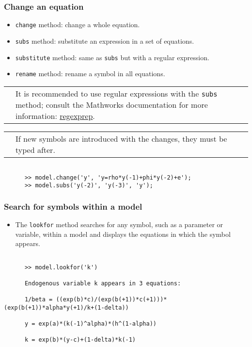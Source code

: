\documentclass[10pt,slidestop]{beamer}
\makeatletter
\theoremstyle{plain}
\newcommand{\dnote}[1]{%
    \noindent %
    \begin{tabular}{@{}m{0.13\textwidth}@{}m{0.87\textwidth}@{}}%
        \huge\textdbend &#1%
    \end{tabular}%
    \par %
}
\makeatother
\begin{document}
\begin{frame}[c,fragile]
  \frametitle{Change an equation}

  \begin{itemize}
  \item \verb+change+ method: change a whole equation.
  \item \verb+subs+ method: substitute an expression in a set of equations.
  \item \verb+substitute+ method: same as \verb+subs+ but with a regular expression.
  \item \verb+rename+ method: rename a symbol in all equations.
  \end{itemize}

    \medskip

    \dnote{It is recommended to use regular expressions with the \texttt{subs} method; consult the Mathworks documentation for more information: \href{https://fr.mathworks.com/help/matlab/ref/regexprep.html}{regexprep}.}

    \bigskip

    \dnote{If new symbols are introduced with the changes, they must be typed after.}

    \bigskip

    \begin{lstlisting}[style=MatlabConsole]

      >> model.change('y', 'y=rho*y(-1)+phi*y(-2)+e');
      >> model.subs('y(-2)', 'y(-3)', 'y');
  \end{lstlisting}

\end{frame}


\begin{frame}[c,fragile]
  \frametitle{Search for symbols within a model}

  \begin{itemize}

  \item The \verb+lookfor+ method searches for any symbol, such as a parameter or variable, within a model and displays the equations in which the symbol appears.\newline

  \end{itemize}

    \medskip

    \begin{lstlisting}[style=MatlabConsole]

      >> model.lookfor('k')

      Endogenous variable k appears in 3 equations:

      1/beta = ((exp(b)*c)/(exp(b(+1))*c(+1)))*(exp(b(+1))*alpha*y(+1)/k+(1-delta))

      y = exp(a)*(k(-1)^alpha)*(h^(1-alpha))

      k = exp(b)*(y-c)+(1-delta)*k(-1)
  \end{lstlisting}

\end{frame}
\end{document}
